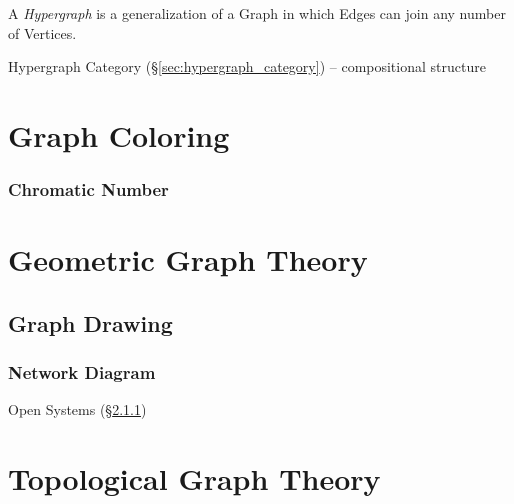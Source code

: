 A \emph{Hypergraph} is a generalization of a Graph in which Edges can
join any number of Vertices.

\fist Hypergraph Category (\S\ref{sec:hypergraph_category}) --
compositional structure



\section{Graph Coloring}\label{sec:graph_coloring}

\subsubsection{Chromatic Number}\label{sec:chromatic_number}




\section{Geometric Graph Theory}\label{sec:geometric_graph_theory}

\subsection{Graph Drawing}\label{sec:graph_drawing}

\subsubsection{Network Diagram}\label{sec:network_diagram}


Open Systems (\S\ref{sec:network_diagram})



\section{Topological Graph Theory}\label{sec:topological_graph_theory}

